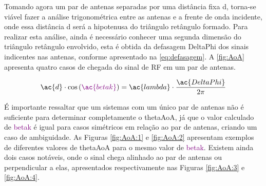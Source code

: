 
Tomando agora um par de antenas separadas por uma distância fixa \ac{d}, torna-se viável fazer a análise trigonométrica entre as antenas e a frente de onda incidente, onde essa distância \ac{d} será a hipotenusa do triângulo retângulo formado.
Para realizar esta análise, ainda é necessário conhecer uma segunda dimensão do triângulo retângulo envolvido, esta é obtida da defasagem \ac{DeltaPhi} dos sinais indicentes nas antenas, conforme apresentado na \autoref{eq:defasagem}.
A \autoref{fig:AoA} apresenta quatro casos de chegada do sinal de \ac{RF} em um par de antenas.


\begin{equation} \label{eq:defasagem}
    \ac{d} \cdot
    \cos\left(\textcolor{Purple}{\ac{betak}}\right) =
    \ac{lambda} \cdot
    \frac{\ac{DeltaPhi}}{2 \pi}
\end{equation}


É importante ressaltar que um sistemas com um único par de antenas não é suficiente para determinar completamente o \ac{thetaAoA}, já que o valor calculado de \textcolor{Purple}{\ac{betak}} é igual para casos simétricos em relação ao par de antenas, criando um caso de ambiguidade.
As Figuras \ref{fig:AoA:1} e \ref{fig:AoA:2} apresentam exemplos de diferentes valores de \ac{thetaAoA} para o mesmo valor de \textcolor{Purple}{\ac{betak}}.
Existem ainda dois casos notáveis, onde o sinal chega alinhado ao par de antenas ou perpendicular a elas, apresentados respectivamente nas Figuras \ref{fig:AoA:3} e \ref{fig:AoA:4}.

